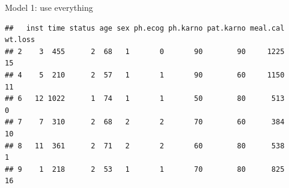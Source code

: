 \begin{frame}[fragile]{Model 1: use everything}

{\scriptsize  
 
\begin{knitrout}
\color{fgcolor}\begin{kframe}
\begin{alltt}
\end{alltt}
\begin{verbatim}
##   inst time status age sex ph.ecog ph.karno pat.karno meal.cal wt.loss
## 2    3  455      2  68   1       0       90        90     1225      15
## 4    5  210      2  57   1       1       90        60     1150      11
## 6   12 1022      1  74   1       1       50        80      513       0
## 7    7  310      2  68   2       2       70        60      384      10
## 8   11  361      2  71   2       2       60        80      538       1
## 9    1  218      2  53   1       1       70        80      825      16
\end{verbatim}
\end{kframe}
\end{knitrout}

}

\begin{knitrout}
\color{fgcolor}\begin{kframe}
\begin{alltt}
\hlkwb{=}\hlopt{==}\hlstd{))}
\hlkwb{=}\hlopt{~}\hlopt{+}\hlopt{+}\hlopt{+}\hlopt{+}\hlopt{+}
               \hlopt{+}
\end{alltt}
\end{kframe}
\end{knitrout}


\end{frame}

